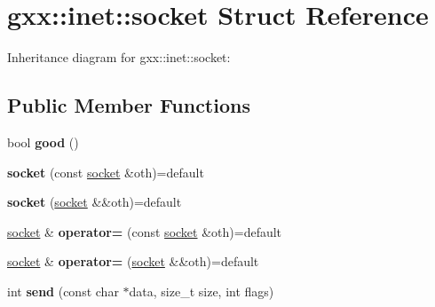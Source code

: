 \hypertarget{structgxx_1_1inet_1_1socket}{}\section{gxx\+:\+:inet\+:\+:socket Struct Reference}
\label{structgxx_1_1inet_1_1socket}


Inheritance diagram for gxx\+:\+:inet\+:\+:socket\+:
\subsection*{Public Member Functions}
\begin{DoxyCompactItemize}
\item 
bool {\bfseries good} ()\hypertarget{structgxx_1_1inet_1_1socket_a574ed507e783d40ef441cf71a3f89f05}{}\label{structgxx_1_1inet_1_1socket_a574ed507e783d40ef441cf71a3f89f05}

\item 
{\bfseries socket} (const \hyperlink{structgxx_1_1inet_1_1socket}{socket} \&oth)=default\hypertarget{structgxx_1_1inet_1_1socket_a035f2e5d190567b033278365cb786744}{}\label{structgxx_1_1inet_1_1socket_a035f2e5d190567b033278365cb786744}

\item 
{\bfseries socket} (\hyperlink{structgxx_1_1inet_1_1socket}{socket} \&\&oth)=default\hypertarget{structgxx_1_1inet_1_1socket_af7d0dcb50eecf5bdc31b049596701856}{}\label{structgxx_1_1inet_1_1socket_af7d0dcb50eecf5bdc31b049596701856}

\item 
\hyperlink{structgxx_1_1inet_1_1socket}{socket} \& {\bfseries operator=} (const \hyperlink{structgxx_1_1inet_1_1socket}{socket} \&oth)=default\hypertarget{structgxx_1_1inet_1_1socket_ae8cd615d60979f2735f653b8c628e442}{}\label{structgxx_1_1inet_1_1socket_ae8cd615d60979f2735f653b8c628e442}

\item 
\hyperlink{structgxx_1_1inet_1_1socket}{socket} \& {\bfseries operator=} (\hyperlink{structgxx_1_1inet_1_1socket}{socket} \&\&oth)=default\hypertarget{structgxx_1_1inet_1_1socket_a09e6913d0acc9051df373191c9958775}{}\label{structgxx_1_1inet_1_1socket_a09e6913d0acc9051df373191c9958775}

\item 
int {\bfseries send} (const char $\ast$data, size\+\_\+t size, int flags)\hypertarget{structgxx_1_1inet_1_1socket_af1acab020711575172b6e44c993aac09}{}\label{structgxx_1_1inet_1_1socket_af1acab020711575172b6e44c993aac09}


\end{DoxyCompactItemize}
